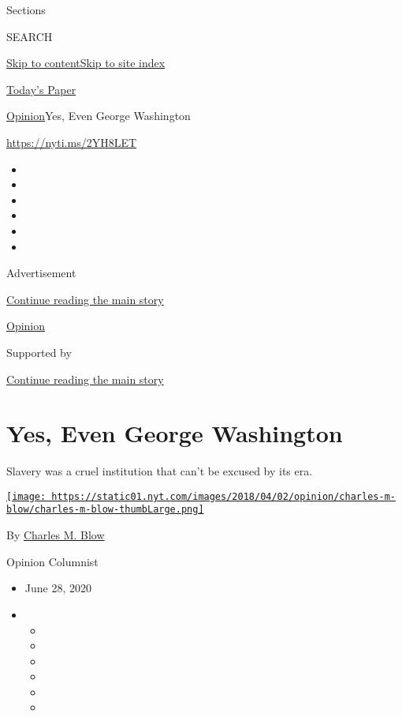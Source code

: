 Sections

SEARCH

\protect\hyperlink{site-content}{Skip to
content}\protect\hyperlink{site-index}{Skip to site index}

\href{https://myaccount.nytimes.com/auth/login?response_type=cookie\&client_id=vi}{}

\href{https://www.nytimes.com/section/todayspaper}{Today's Paper}

\href{/section/opinion}{Opinion}\textbar{}Yes, Even George Washington

\href{https://nyti.ms/2YH8LET}{https://nyti.ms/2YH8LET}

\begin{itemize}
\item
\item
\item
\item
\item
\item
\end{itemize}

Advertisement

\protect\hyperlink{after-top}{Continue reading the main story}

\href{/section/opinion}{Opinion}

Supported by

\protect\hyperlink{after-sponsor}{Continue reading the main story}

\hypertarget{yes-even-george-washington}{%
\section{Yes, Even George Washington}\label{yes-even-george-washington}}

Slavery was a cruel institution that can't be excused by its era.

\href{https://www.nytimes.com/by/charles-m-blow}{\texttt{[image: https://static01.nyt.com/images/2018/04/02/opinion/charles-m-blow/charles-m-blow-thumbLarge.png]}}

By \href{https://www.nytimes.com/by/charles-m-blow}{Charles M. Blow}

Opinion Columnist

\begin{itemize}
\item
  June 28, 2020
\item
  \begin{itemize}
  \item
  \item
  \item
  \item
  \item
  \item
  \end{itemize}
\end{itemize}

